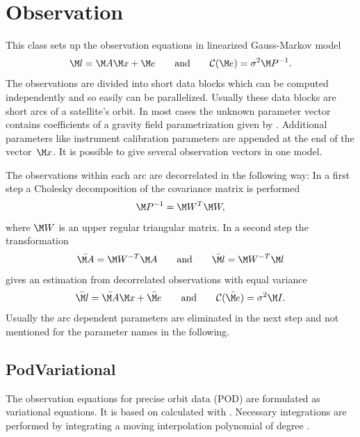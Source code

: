 \clearpage

\section{Observation}\label{observationType}
This class sets up the observation equations in linearized Gauss-Markov model
\begin{equation}\label{gmm}
\M l  = \M A \M x + \M e\qquad\text{and}\qquad\mathcal{C}(\M e) = \sigma^2\M P^{-1}.
\end{equation}
The observations are divided into short data blocks which can be computed independently
and so easily can be parallelized. Usually these data blocks are short arcs of a
satellite's orbit. In most cases the unknown parameter vector contains coefficients
of a gravity field parametrization given by .
Additional parameters like instrument calibration parameters are appended at the
end of the vector~$\M x$.
It is possible to give several observation vectors in one model.

The observations within each arc are decorrelated in the following way:
In a first step a Cholesky decomposition of the covariance matrix is performed
\begin{equation}
\M P^{-1} = \M W^T\M W,
\end{equation}
where $\M W$ is an upper regular triangular matrix.
In a second step the transformation
\begin{equation}\label{dekorrelierung}
\bar{\M A} = \M W^{-T}\M A\qquad\text{and}\qquad \bar{\M l} = \M W^{-T}\M l
\end{equation}
gives an estimation from decorrelated observations with equal variance
\begin{equation}\label{normal.GMM}
\bar{\M l} = \bar{\M A} \M x + \bar{\M e}
\qquad\text{and}\qquad
\mathcal{C}(\bar{\M e})= \sigma^2 \M I.
\end{equation}
Usually the arc dependent parameters are eliminated in the next step
and not mentioned for the parameter names in the following.


\subsection{PodVariational}\label{observationType:podVariational}
The observation equations for precise orbit data (POD) are formulated as variational equations.
It is based on  calculated with .
Necessary integrations are performed by integrating a moving interpolation polynomial of degree .


